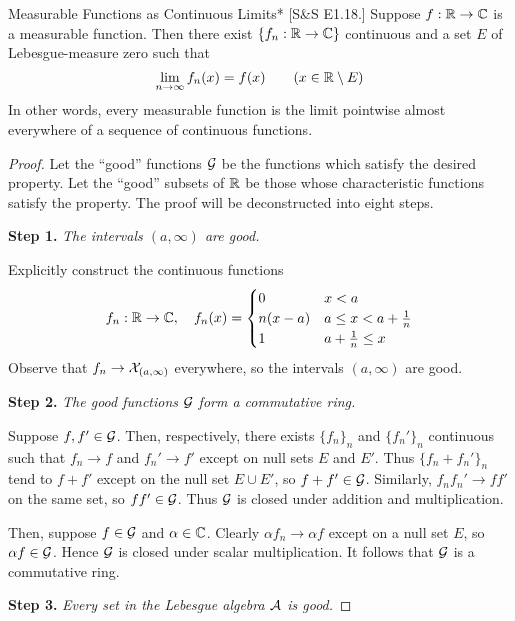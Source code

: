 \begin{problem}{Measurable Functions as Continuous Limits}*
    [S\&S E1.18.] Suppose \(f : \mathbb{R} \to \mathbb{C}\) is a measurable function. Then there exist \(\{f_n : \mathbb{R} \to \mathbb{C}\}\) continuous and a set \(E\) of Lebesgue-measure zero such that 
    \[
    \lim_{n \to \infty} f_n(x) = f(x) \qquad (x \in \mathbb{R} \setminus E)
    \]
    In other words, every measurable function is the limit pointwise almost everywhere of a sequence of continuous functions. 
\end{problem}

\begin{proof}
    Let the ``good'' functions \(\mathcal{G}\) be the functions which satisfy the desired property. Let the ``good'' subsets of \(\mathbb{R}\) be those whose characteristic functions satisfy the property. The proof will be deconstructed into eight steps. 

    \textbf{Step 1.} \textit{The intervals \((a, \infty)\) are good.}

    Explicitly construct the continuous functions
    \[
    f_n : \mathbb{R} \to \mathbb{C}, \quad 
    f_n(x) = \begin{cases}
    0 & x < a \\
    n(x - a) & a \leq x < a + \frac{1}{n} \\
    1 & a + \frac{1}{n} \leq x
    \end{cases}
    \]
    Observe that \(f_n \to \mathcal{X}_{(a, \infty)}\) everywhere, so the intervals \((a, \infty)\) are good. 

    \textbf{Step 2.} \textit{The good functions \(\mathcal{G}\) form a commutative ring.}

    Suppose \(f, f' \in \mathcal{G}\). Then, respectively, there exists \(\{f_n\}_n\) and \(\{f_n'\}_n\) continuous such that \(f_n \to f\) and \(f_n' \to f'\) except on null sets \(E\) and \(E'\). Thus \(\{f_n + f_n'\}_n\) tend to \(f+f'\) except on the null set \(E \cup E'\), so \(f + f' \in \mathcal{G}\). Similarly, \(f_n f_n' \to ff'\) on the same set, so \(f f' \in \mathcal{G}\). Thus \(\mathcal{G}\) is closed under addition and multiplication.

    Then, suppose \(f \in \mathcal{G}\) and \(\alpha \in \mathbb{C}\). Clearly \(\alpha f_n \to \alpha f\) except on a null set \(E\), so \(\alpha f \in \mathcal{G}\). Hence \(\mathcal{G}\) is closed under scalar multiplication. It follows that \(\mathcal{G}\) is a commutative ring. 

    \textbf{Step 3.} \textit{Every set in the Lebesgue algebra \(\mathcal{A}\) is good.}


\end{proof}

